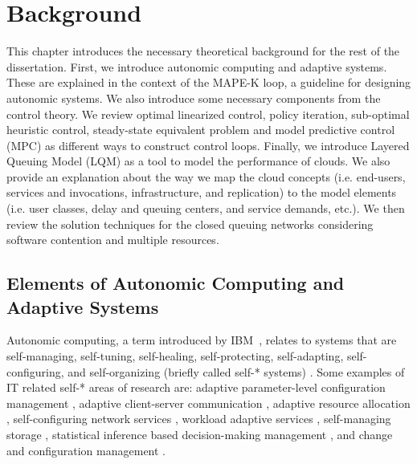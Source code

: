    
 \chapter{Background}    
 \label{ch:background}  
  This chapter introduces the necessary theoretical background for the rest of the dissertation. First, we introduce autonomic computing and adaptive systems. These are explained in the context of  the MAPE-K loop, a guideline for designing autonomic systems.  
  We also introduce some necessary components from the control theory. We review optimal linearized control, policy iteration, sub-optimal heuristic control, steady-state equivalent problem and model predictive control (MPC) as different ways to construct control loops. Finally, we introduce Layered Queuing Model (LQM) as a tool to model the performance of clouds. We also provide an explanation about the way we map the cloud concepts (i.e. end-users,
  services and  invocations, infrastructure, and replication)  to the model elements (i.e. user classes, delay and queuing centers, and service demands, etc.).  We then review the solution techniques for the closed queuing networks considering software contention and multiple resources. 
   
 \section{Elements of Autonomic Computing and Adaptive Systems}
  Autonomic computing, a term introduced by IBM~\cite{computing2005architectural}, relates to systems that are self-managing, self-tuning, self-healing, self-protecting, self-adapting, self-configuring, and self-organizing (briefly called self-* systems) \cite{babaoglu2005grassroots}. 
Some examples of IT related self-* areas of research are:
adaptive parameter-level configuration management \cite{ensink2004coordinating, chang2000automatic, cangussu2004control},  
adaptive client-server communication \cite{loyall1998specifying, noble1997agile, balan2003tactics},  
adaptive resource allocation \cite{doyle_model-based_2003,lee1999scalable}, 
self-configuring network services \cite{huang2004building}, 
workload adaptive services \cite{menasce-accessing-ICAC-2004}, 
self-managing storage \cite{mesnier2004file}, 
statistical inference based decision-making management \cite{cohen2004correlating}, and change and configuration management \cite{wang2003strider}.  

